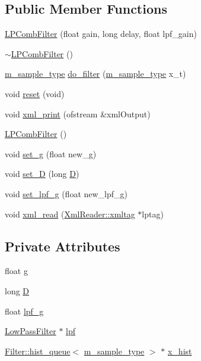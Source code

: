 \subsection*{Public Member Functions}
\begin{CompactItemize}
\item 
\hyperlink{classLPCombFilter_a0}{LPComb\-Filter} (float gain, long delay, float lpf\_\-gain)
\item 
\hyperlink{classLPCombFilter_a1}{$\sim$LPComb\-Filter} ()
\item 
\hyperlink{Types_8h_a0}{m\_\-sample\_\-type} \hyperlink{classLPCombFilter_a2}{do\_\-filter} (\hyperlink{Types_8h_a0}{m\_\-sample\_\-type} x\_\-t)
\item 
void \hyperlink{classLPCombFilter_a3}{reset} (void)
\item 
void \hyperlink{classLPCombFilter_a4}{xml\_\-print} (ofstream \&xml\-Output)
\item 
\hyperlink{classLPCombFilter_a5}{LPComb\-Filter} ()
\item 
void \hyperlink{classLPCombFilter_a6}{set\_\-g} (float new\_\-g)
\item 
void \hyperlink{classLPCombFilter_a7}{set\_\-D} (long \hyperlink{classLPCombFilter_r1}{D})
\item 
void \hyperlink{classLPCombFilter_a8}{set\_\-lpf\_\-g} (float new\_\-lpf\_\-g)
\item 
void \hyperlink{classLPCombFilter_a9}{xml\_\-read} (\hyperlink{classXmlReader_1_1xmltag}{Xml\-Reader::xmltag} $\ast$lptag)
\end{CompactItemize}
\subsection*{Private Attributes}
\begin{CompactItemize}
\item 
float \hyperlink{classLPCombFilter_r0}{g}
\item 
long \hyperlink{classLPCombFilter_r1}{D}
\item 
float \hyperlink{classLPCombFilter_r2}{lpf\_\-g}
\item 
\hyperlink{classLowPassFilter}{Low\-Pass\-Filter} $\ast$ \hyperlink{classLPCombFilter_r3}{lpf}
\item 
\hyperlink{classFilter_1_1hist__queue}{Filter::hist\_\-queue}$<$ \hyperlink{Types_8h_a0}{m\_\-sample\_\-type} $>$ $\ast$ \hyperlink{classLPCombFilter_r4}{x\_\-hist}
\end{CompactItemize}


